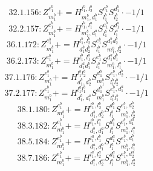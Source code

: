 \documentclass[letterpaper,10pt,fleqn,leqno,onecolumn]{article}
\begin{document}
\begin{equation} \;\;\;\;\;\;  32.1.156: Z^{e_{1}^{b}}_{m_{1}^{b}}+=H^{l_{1}^{b},l_{2}^{b}}_{m_{1}^{b},d_{1}^{b}}S^{e_{1}^{b}}_{l_{1}^{b}}S^{d_{1}^{b}}_{l_{2}^{b}}\cdot -1/1 \end{equation}
\begin{equation} \;\;\;\;\;\;  32.2.157: Z^{e_{1}^{b}}_{m_{1}^{b}}+=H^{l_{1}^{b},l_{1}^{a}}_{m_{1}^{b},d_{1}^{a}}S^{e_{1}^{b}}_{l_{1}^{b}}S^{d_{1}^{a}}_{l_{1}^{a}}\cdot -1/1 \end{equation}
\begin{equation} \;\;\;\;\;\;  36.1.172: Z^{e_{1}^{b}}_{m_{1}^{b}}+=H^{l_{1}^{b},l_{2}^{b}}_{d_{1}^{b}d_{2}^{b}}S^{e_{1}^{b}}_{l_{1}^{b}}S^{d_{1}^{b}d_{2}^{b}}_{m_{1}^{b},l_{2}^{b}}\cdot -1/1 \end{equation}
\begin{equation} \;\;\;\;\;\;  36.2.173: Z^{e_{1}^{b}}_{m_{1}^{b}}+=H^{l_{1}^{b},l_{1}^{a}}_{d_{1}^{a}d_{1}^{b}}S^{e_{1}^{b}}_{l_{1}^{b}}S^{d_{1}^{a}d_{1}^{b}}_{m_{1}^{b},l_{1}^{a}}\cdot -1/1 \end{equation}
\begin{equation} \;\;\;\;\;\;  37.1.176: Z^{e_{1}^{b}}_{m_{1}^{b}}+=H^{l_{1}^{b}l_{2}^{b}}_{d_{1}^{b},d_{2}^{b}}S^{d_{1}^{b}}_{m_{1}^{b}}S^{e_{1}^{b},d_{2}^{b}}_{l_{1}^{b}l_{2}^{b}}\cdot -1/1 \end{equation}
\begin{equation} \;\;\;\;\;\;  37.2.177: Z^{e_{1}^{b}}_{m_{1}^{b}}+=H^{l_{1}^{a}l_{1}^{b}}_{d_{1}^{b},d_{1}^{a}}S^{d_{1}^{b}}_{m_{1}^{b}}S^{e_{1}^{b},d_{1}^{a}}_{l_{1}^{a}l_{1}^{b}}\cdot -1/1 \end{equation}
\begin{equation} \;\;\;\;\;\;  38.1.180: Z^{e_{1}^{b}}_{m_{1}^{b}}+=H^{l_{1}^{b},l_{2}^{b}}_{d_{1}^{b},d_{2}^{b}}S^{d_{1}^{b}}_{l_{1}^{b}}S^{e_{1}^{b},d_{2}^{b}}_{m_{1}^{b},l_{2}^{b}} \end{equation}
\begin{equation} \;\;\;\;\;\;  38.3.182: Z^{e_{1}^{b}}_{m_{1}^{b}}+=H^{l_{1}^{b},l_{1}^{a}}_{d_{1}^{b},d_{1}^{a}}S^{d_{1}^{b}}_{l_{1}^{b}}S^{e_{1}^{b},d_{1}^{a}}_{m_{1}^{b},l_{1}^{a}} \end{equation}
\begin{equation} \;\;\;\;\;\;  38.5.184: Z^{e_{1}^{b}}_{m_{1}^{b}}+=H^{l_{1}^{a},l_{1}^{b}}_{d_{1}^{a},d_{1}^{b}}S^{d_{1}^{a}}_{l_{1}^{a}}S^{e_{1}^{b},d_{1}^{b}}_{m_{1}^{b},l_{1}^{b}} \end{equation}
\begin{equation} \;\;\;\;\;\;  38.7.186: Z^{e_{1}^{b}}_{m_{1}^{b}}+=H^{l_{1}^{a},l_{2}^{a}}_{d_{1}^{a},d_{2}^{a}}S^{d_{1}^{a}}_{l_{1}^{a}}S^{e_{1}^{b},d_{2}^{a}}_{m_{1}^{b},l_{2}^{a}} \end{equation}
\end{document}
